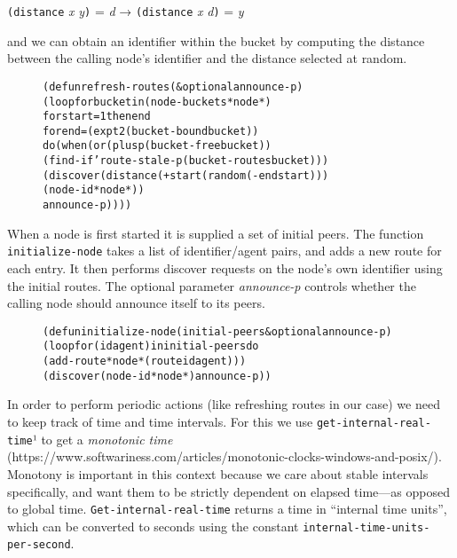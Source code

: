 \documentclass [a4paper,12pt,oneside]{article}\usepackage [paper=a4paper,left=37.5264mm,right=37.5264mm,top=37.5264mm,bottom=37.5264mm]{geometry}\usepackage {graphicx}\usepackage {tabularx}\usepackage {alltt}\usepackage {float}\usepackage [section]{placeins}\usepackage {titling}\setlength {\droptitle }{-4em}\pretitle {\begin {flushright}\bfseries \LARGE }\posttitle {\end {flushright}}\preauthor {\begin {flushright}}\postauthor {\end {flushright}}\predate {\begin {flushright}}\postdate {\end {flushright}}\usepackage [english]{babel}\usepackage [T1]{fontenc}\usepackage [utf8x]{inputenc}\usepackage {stmaryrd}\usepackage {amsfonts}\DeclareUnicodeCharacter {12314}{$\llbracket $}\DeclareUnicodeCharacter {12315}{$\rrbracket $}\DeclareUnicodeCharacter {9655}{$\rhd $}\newcommand \nobreakdash {\mbox {-}}\DeclareUnicodeCharacter {8209}{\nobreakdash }\usepackage [sc]{mathpazo}\linespread {1.05}\usepackage [font={small},labelformat=empty,labelsep=none]{caption}\tolerance=10000 \clubpenalty=10000 \widowpenalty=10000 \frenchspacing
\begin{document}
\medskip 

\noindent \texttt {(distance} \textit {x} \textit {y}\texttt {)} = \textit {d} → \texttt {(distance} \textit {x} \textit {d}\texttt {)} = \textit {y}

\medskip and we can obtain an identifier within the bucket by computing the distance between the calling node’s identifier and the distance selected at random.

\begin {figure}[H]\centering \begin {alltt}
(defun refresh-routes (\&optional announce-p)
  (loop for bucket in (node-buckets *node*)
        for start = 1 then end
        for end = (expt 2 (bucket-bound bucket))
     do (when (or (plusp (bucket-free bucket))
                  (find-if 'route-stale-p (bucket-routes bucket)))
          (discover (distance (+ start (random (- end start)))
                              (node-id *node*))
           announce-p))))
\end{alltt}\vspace {-1em}\end {figure}

When a node is first started it is supplied a set of initial peers. The function \texttt {initialize-node} takes a list of identifier/agent pairs, and adds a new route for each entry. It then performs discover requests on the node’s own identifier using the initial routes. The optional parameter \textit {announce-p} controls whether the calling node should announce itself to its peers.

\begin {figure}[H]\centering \begin {alltt}
(defun initialize-node (initial-peers \&optional announce-p)
  (loop for (id agent) in initial-peers do
       (add-route *node* (route id agent)))
  (discover (node-id *node*) announce-p))
\end{alltt}\vspace {-1em}\end {figure}

In order to perform periodic actions (like refreshing routes in our case) we need to keep track of time and time intervals. For this we use \texttt {get-internal-real-time}¹ to get a \textit {monotonic time} (\textsf {https:/\allowbreak /\allowbreak www.softwariness.com/\allowbreak articles/\allowbreak monotonic-clocks-windows-and-posix/\allowbreak }). Monotony is important in this context because we care about stable intervals specifically, and want them to be strictly dependent on elapsed time—as opposed to global time. \texttt {Get-internal-real-time} returns a time in “internal time units”, which can be converted to seconds using the constant \texttt {internal-time-units-per-second}.
\end{document}
